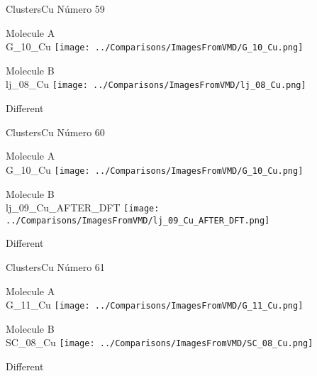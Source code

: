  \newpage

\vtab[-3cm]
\begin{center}
{\large ClustersCu \tab Número 59}
\end{center}
\begin{multicols}{2}
\begin{center}
Molecule A \\ 
G\_10\_Cu
\texttt{[image: ../Comparisons/ImagesFromVMD/G\_10\_Cu.png]}
\\
\vtab

\columnbreak
Molecule B \\ 
lj\_08\_Cu
\texttt{[image: ../Comparisons/ImagesFromVMD/lj\_08\_Cu.png]}
\\
\vtab


\end{center}
\end{multicols}
\begin{center}
\textcolor{NavyBlue}{\Large Different}
\end{center}

 \newpage

\vtab[-3cm]
\begin{center}
{\large ClustersCu \tab Número 60}
\end{center}
\begin{multicols}{2}
\begin{center}
Molecule A \\ 
G\_10\_Cu
\texttt{[image: ../Comparisons/ImagesFromVMD/G\_10\_Cu.png]}
\\
\vtab

\columnbreak
Molecule B \\ 
lj\_09\_Cu\_AFTER\_DFT
\texttt{[image: ../Comparisons/ImagesFromVMD/lj\_09\_Cu\_AFTER\_DFT.png]}
\\
\vtab


\end{center}
\end{multicols}
\begin{center}
\textcolor{NavyBlue}{\Large Different}
\end{center}

 \newpage

\vtab[-3cm]
\begin{center}
{\large ClustersCu \tab Número 61}
\end{center}
\begin{multicols}{2}
\begin{center}
Molecule A \\ 
G\_11\_Cu
\texttt{[image: ../Comparisons/ImagesFromVMD/G\_11\_Cu.png]}
\\
\vtab

\columnbreak
Molecule B \\ 
SC\_08\_Cu
\texttt{[image: ../Comparisons/ImagesFromVMD/SC\_08\_Cu.png]}
\\
\vtab


\end{center}
\end{multicols}
\begin{center}
\textcolor{NavyBlue}{\Large Different}
\end{center}

